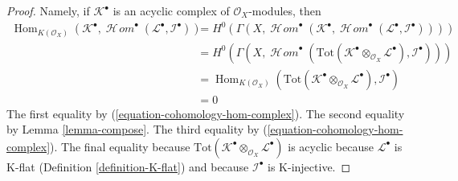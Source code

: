 \documentclass[10pt,a4paper]{amsart}
\theoremstyle{plain}
\theoremstyle{definition}
\theoremstyle{remark}
\numberwithin{equation}{subsection}
\def\Hom{\mathop{\mathrm{Hom}}\nolimits}
\def\SheafHom{\mathop{\mathcal{H}\!\mathit{om}}\nolimits}
\begin{document}
\begin{proof}
Namely, if $\mathcal{K}^\bullet$ is an acyclic complex of
$\mathcal{O}_X$-modules, then
\begin{align*}
\Hom_{K(\mathcal{O}_X)}(\mathcal{K}^\bullet,
\SheafHom^\bullet(\mathcal{L}^\bullet, \mathcal{I}^\bullet))
& =
H^0(\Gamma(X,
\SheafHom^\bullet(\mathcal{K}^\bullet,
\SheafHom^\bullet(\mathcal{L}^\bullet, \mathcal{I}^\bullet)))) \\
& =
H^0(\Gamma(X, \SheafHom^\bullet(\text{Tot}(
\mathcal{K}^\bullet \otimes_{\mathcal{O}_X} \mathcal{L}^\bullet),
\mathcal{I}^\bullet))) \\
& =
\Hom_{K(\mathcal{O}_X)}(
\text{Tot}(\mathcal{K}^\bullet \otimes_{\mathcal{O}_X} \mathcal{L}^\bullet),
\mathcal{I}^\bullet) \\
& =
0
\end{align*}
The first equality by (\ref{equation-cohomology-hom-complex}).
The second equality by Lemma \ref{lemma-compose}.
The third equality by (\ref{equation-cohomology-hom-complex}).
The final equality because
$\text{Tot}(\mathcal{K}^\bullet \otimes_{\mathcal{O}_X} \mathcal{L}^\bullet)$
is acyclic because $\mathcal{L}^\bullet$ is K-flat
(Definition \ref{definition-K-flat}) and because $\mathcal{I}^\bullet$
is K-injective.
\end{proof}
\end{document}
